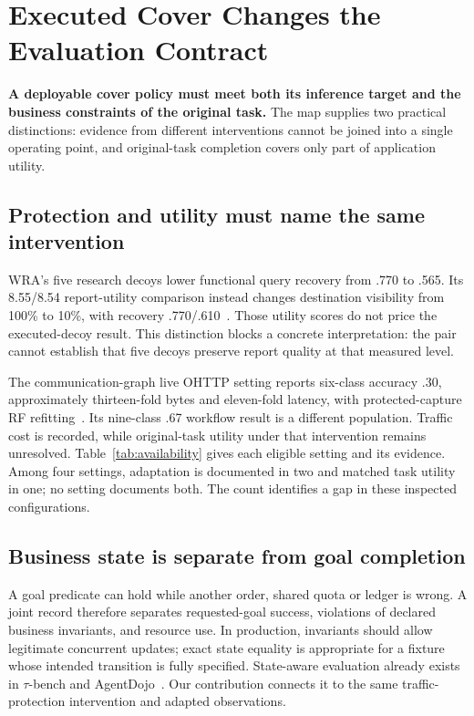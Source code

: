 \section{Executed Cover Changes the Evaluation Contract}\label{sec:evidence}
\textbf{A deployable cover policy must meet both its inference target and the business constraints of the original task.}
The map supplies two practical distinctions: evidence from different interventions cannot be joined into a single operating point, and original-task completion covers only part of application utility.

\subsection{Protection and utility must name the same intervention}\label{sec:targets}
WRA's five research decoys lower functional query recovery from .770 to .565. Its 8.55/8.54 report-utility comparison instead changes destination visibility from 100\% to 10\%, with recovery .770/.610~\cite{jeong2026wra}. Those utility scores do not price the executed-decoy result. This distinction blocks a concrete interpretation: the pair cannot establish that five decoys preserve report quality at that measured level.

The communication-graph live OHTTP setting reports six-class accuracy .30, approximately thirteen-fold bytes and eleven-fold latency, with protected-capture RF refitting~\cite{dangol2026workflow}. Its nine-class .67 workflow result is a different population. Traffic cost is recorded, while original-task utility under that intervention remains unresolved. Table~\ref{tab:availability} gives each eligible setting and its evidence. Among four settings, adaptation is documented in two and matched task utility in one; no setting documents both. The count identifies a gap in these inspected configurations.

\subsection{Business state is separate from goal completion}\label{sec:authorization}
A goal predicate can hold while another order, shared quota or ledger is wrong. A joint record therefore separates requested-goal success, violations of declared business invariants, and resource use. In production, invariants should allow legitimate concurrent updates; exact state equality is appropriate for a fixture whose intended transition is fully specified. State-aware evaluation already exists in $\tau$-bench and AgentDojo~\cite{yao2024taubench,debenedetti2024agentdojo}. Our contribution connects it to the same traffic-protection intervention and adapted observations.

